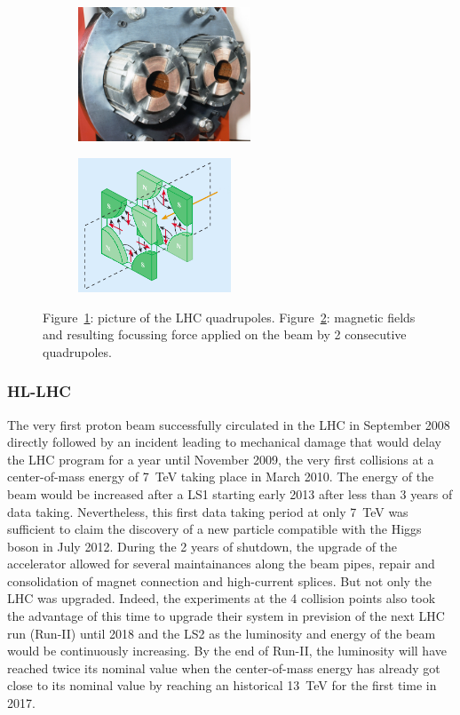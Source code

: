 	\begin{figure}[H]
		\begin{subfigure}{0.5\linewidth}
			\centering
			\includegraphics[height = 4cm]{fig/chapt2/LHC-quadrupole.jpg}
			\caption{\label{fig:LHCQuadrupole:A}}
		\end{subfigure}
		\begin{subfigure}{0.5\linewidth}
			\centering
			\includegraphics[height = 4cm]{fig/chapt2/LHC-quadrupole-field.png}
			\caption{\label{fig:LHCQuadrupole:B}}
		\end{subfigure}
		\caption{\label{fig:LHCQuadrupole} Figure~\ref{fig:LHCQuadrupole:A}: picture of the LHC quadrupoles. Figure~\ref{fig:LHCQuadrupole:B}: magnetic fields and resulting focussing force applied on the beam by 2 consecutive quadrupoles.}
	\end{figure}
	
		\subsubsection{\acl{HL-LHC}}
		\label{chapt2:sssec:HL-LHC}
		
	The very first proton beam successfully circulated in the LHC in September 2008 directly followed by an incident leading to mechanical damage that would delay the LHC program for a year until November 2009, the very first collisions at a center-of-mass energy of \SI{7}{TeV} taking place in March 2010. The energy of the beam would be increased after a \acf{LS1} starting early 2013 after less than 3 years of data taking. Nevertheless, this first data taking period at only \SI{7}{TeV} was sufficient to claim the discovery of a new particle compatible with the Higgs boson in July 2012. During the 2 years of shutdown, the upgrade of the accelerator allowed for several maintainances along the beam pipes, repair and consolidation of magnet connection and high-current splices. But not only the LHC was upgraded. Indeed, the experiments at the 4 collision points also took the advantage of this time to upgrade their system in prevision of the next LHC run (Run-II) until 2018 and the \acf{LS2} as the luminosity and energy of the beam would be continuously increasing. By the end of Run-II, the luminosity will have reached twice its nominal value when the center-of-mass energy has already got close to its nominal value by reaching an historical \SI{13}{TeV} for the first time in 2017.
	
